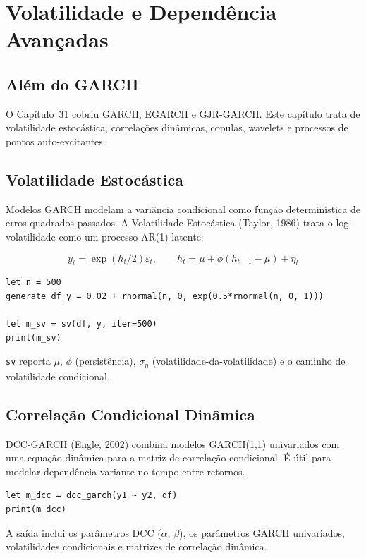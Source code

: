 \chapter{Volatilidade e Dependência Avançadas}

\section{Além do GARCH}

O Capítulo~31 cobriu GARCH, EGARCH e GJR-GARCH. Este capítulo trata de
volatilidade estocástica, correlações dinâmicas, copulas, wavelets e
processos de pontos auto-excitantes.

\section{Volatilidade Estocástica}

Modelos GARCH modelam a variância condicional como função
determinística de erros quadrados passados. A Volatilidade Estocástica
(Taylor, 1986) trata o log-volatilidade como um processo AR(1) latente:

\[
y_t = \exp(h_t/2) \varepsilon_t, \qquad
h_t = \mu + \phi(h_{t-1} - \mu) + \eta_t
\]

\begin{lstlisting}[caption={Volatilidade Estocástica}]
let n = 500
generate df y = 0.02 + rnormal(n, 0, exp(0.5*rnormal(n, 0, 1)))

let m_sv = sv(df, y, iter=500)
print(m_sv)
\end{lstlisting}

\texttt{sv} reporta $\mu$, $\phi$ (persistência), $\sigma_\eta$
(volatilidade-da-volatilidade) e o caminho de volatilidade condicional.

\section{Correlação Condicional Dinâmica}

DCC-GARCH (Engle, 2002) combina modelos GARCH(1,1) univariados com uma
equação dinâmica para a matriz de correlação condicional. É útil para
modelar dependência variante no tempo entre retornos.

\begin{lstlisting}[caption={DCC-GARCH}]
let m_dcc = dcc_garch(y1 ~ y2, df)
print(m_dcc)
\end{lstlisting}

A saída inclui os parâmetros DCC ($\alpha$, $\beta$), os parâmetros
GARCH univariados, volatilidades condicionais e matrizes de correlação
dinâmica.

